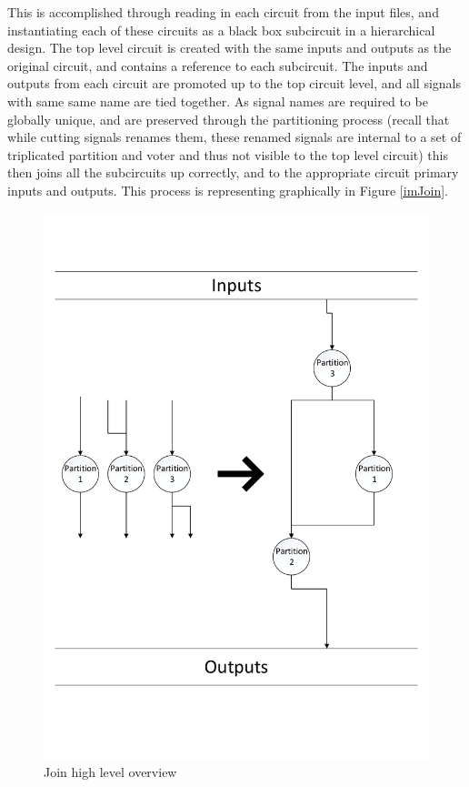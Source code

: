 \documentclass[12pt,final,oneside,a4paper]{dwThesis} %
\begin{document}
   This is accomplished through reading in each circuit from the input files, and instantiating each of these circuits as a black box subcircuit in a hierarchical design.
   The top level circuit is created with the same inputs and outputs as the original circuit, and contains a reference to each subcircuit.
   The inputs and outputs from each circuit are promoted up to the top circuit level, and all signals with same same name are tied together.
   As signal names are required to be globally unique, and are preserved through the partitioning process (recall that while cutting signals renames them, these renamed signals are internal to a set of triplicated partition and voter and thus not visible to the top level circuit) this then joins all the subcircuits up correctly, and to the appropriate circuit primary inputs and outputs.
   This process is representing graphically in Figure \ref{imJoin}.
   \begin{figure}

      \begin{center}

         \includegraphics[width=\linewidth]{images/merge.pdf} \caption{Join high level overview}
         \label{imMerge} 
      \end{center}

   \end{figure}
\end{document}
